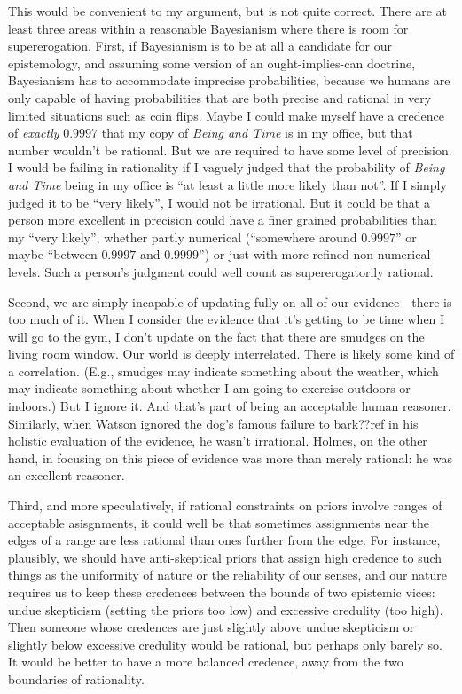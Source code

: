 This would be convenient to my argument, but is not quite correct. There are at least three areas within a reasonable Bayesianism where there is room for supererogation.
First, if Bayesianism is to be at all a candidate for our epistemology, and assuming some version of an ought-implies-can doctrine,
Bayesianism has to accommodate imprecise probabilities, because we humans are only capable of having  
probabilities that are both precise and rational in very limited situations such as coin flips. Maybe I could make myself
have a credence of \textit{exactly} $0.9997$ that my copy of \textit{Being and Time} is in my office, but that number wouldn't 
be rational. But we are required to have some level of precision. I would be failing in rationality if I vaguely judged
that the probability of \textit{Being and Time} being in my office is ``at least a little more likely than not''. If I
simply judged it to be ``very likely'', I would not be irrational. But it could be that a person more excellent in precision
could have a finer grained probabilities than my ``very likely'', whether partly numerical (``somewhere around $0.9997$'' or
maybe ``between $0.9997$ and $0.9999$'') or just with more refined non-numerical levels. Such a person's judgment could well
count as supererogatorily rational. 

Second, we are simply incapable of updating fully on all of our evidence---there is too much of it. When
I consider the evidence that it's getting to be time when I will go to the gym, I don't update on the fact that there are
smudges on the living room window. Our world is deeply interrelated. There is likely some kind of a correlation. (E.g.,
smudges may indicate something about the weather, which may indicate something about whether I am going to exercise outdoors
or indoors.) But I ignore it. And that's part of being an acceptable human reasoner. Similarly, when Watson ignored the dog's
famous failure to bark??ref in his holistic evaluation of the evidence, he wasn't irrational. Holmes, on the other hand, in focusing
on this piece of evidence was more than merely rational: he was an excellent reasoner. 

Third, and more speculatively, if rational constraints on priors involve ranges of acceptable asisgnments, it could well be that 
sometimes assignments near the edges of a range are less rational than ones further from the edge. For instance, plausibly, we 
should have anti-skeptical priors that assign high credence to such things as the uniformity of nature or the reliability of 
our senses, and our nature requires us to keep these credences between the bounds of two epistemic vices: undue skepticism (setting 
the priors too low) and excessive credulity (too high). Then someone whose credences are just slightly above undue skepticism 
or slightly below excessive credulity would be rational, but perhaps only barely so. It would be better to have a more balanced
credence, away from the two boundaries of rationality.

